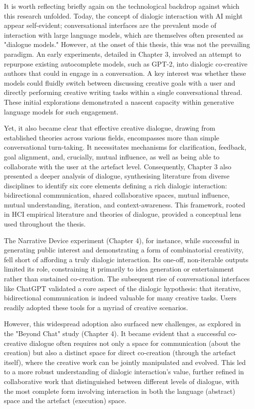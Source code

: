 It is worth reflecting briefly again on the technological backdrop against which this research unfolded. Today, the concept of dialogic interaction with AI might appear self-evident; conversational interfaces are the prevalent mode of interaction with large language models, which are themselves often presented as "dialogue models." However, at the onset of this thesis, this was not the prevailing paradigm. An early experiments, detailed in Chapter 3, involved an attempt to repurpose existing autocomplete models, such as GPT-2, into dialogic co-creative authors that could in engage in a conversation. A key interest was whether these models could fluidly switch between discussing creative goals with a user and directly performing creative writing tasks within a single conversational thread. These initial explorations demonstrated a nascent capacity within generative language models for such engagement.

Yet, it also became clear that effective creative dialogue, drawing from established theories across various fields, encompasses more than simple conversational turn-taking. It necessitates mechanisms for clarification, feedback, goal alignment, and, crucially, mutual influence, as well as being able to collaborate with the user at the artefact level. Consequently, Chapter 3 also presented a deeper analysis of dialogue, synthesising literature from diverse disciplines to identify six core elements defining a rich dialogic interaction: bidirectional communication, shared collaborative spaces, mutual influence, mutual understanding, iteration, and context-awareness. This framework, rooted in HCI empirical literature and theories of dialogue, provided a conceptual lens used throughout the thesis.

The Narrative Device experiment (Chapter 4), for instance, while successful in generating public interest and demonstrating a form of combinatorial creativity, fell short of affording a truly dialogic interaction. Its one-off, non-iterable outputs limited its role, constraining it primarily to idea generation or entertainment rather than sustained co-creation. The subsequent rise of conversational interfaces like ChatGPT validated a core aspect of the dialogic hypothesis: that iterative, bidirectional communication is indeed valuable for many creative tasks. Users readily adopted these tools for a myriad of creative scenarios.

However, this widespread adoption also surfaced new challenges, as explored in the "Beyond Chat" study (Chapter 4). It became evident that a successful co-creative dialogue often requires not only a space for communication (about the creation) but also a distinct space for direct co-creation (through the artefact itself), where the creative work can be jointly manipulated and evolved. This led to a more robust understanding of dialogic interaction's value, further refined in collaborative work that distinguished between different levels of dialogue, with the most complete form involving interaction in both the language (abstract) space and the artefact (execution) space.

